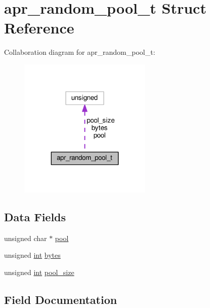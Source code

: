 \hypertarget{structapr__random__pool__t}{}\section{apr\+\_\+random\+\_\+pool\+\_\+t Struct Reference}
\label{structapr__random__pool__t}


Collaboration diagram for apr\+\_\+random\+\_\+pool\+\_\+t\+:
\nopagebreak
\begin{figure}[H]
\begin{center}
\leavevmode
\includegraphics[width=179pt]{structapr__random__pool__t__coll__graph}
\end{center}
\end{figure}
\subsection*{Data Fields}
\begin{DoxyCompactItemize}
\item 
unsigned char $\ast$ \hyperlink{structapr__random__pool__t_a26c534eeecf254ac703913e0367bfb37}{pool}
\item 
unsigned \hyperlink{pcre_8txt_a42dfa4ff673c82d8efe7144098fbc198}{int} \hyperlink{structapr__random__pool__t_ae6fd60ad6e0f71ffbe851baa476b6445}{bytes}
\item 
unsigned \hyperlink{pcre_8txt_a42dfa4ff673c82d8efe7144098fbc198}{int} \hyperlink{structapr__random__pool__t_a5807af0013c3f5b60857a72dfb550b56}{pool\+\_\+size}
\end{DoxyCompactItemize}


\subsection{Field Documentation}
